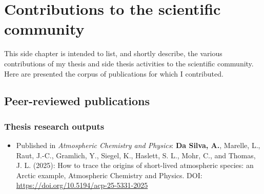 \newpage
\thispagestyle{empty}
\mbox{}
\newpage


\chapter{Contributions to the scientific community}
\label{chap:contrib_commu}

This side chapter is intended to list, and shortly describe, the various contributions of my thesis and side thesis activities to the scientific community.
Here are presented the corpus of publications for which I contributed.

\section*{Peer-reviewed publications}
    \subsection*{Thesis research outputs}
    \begin{itemize}
        \item Published in \textit{Atmospheric Chemistry and Physics}:
            \textbf{Da Silva, A.}, Marelle, L., Raut, J.-C., Gramlich, Y., Siegel, K., Haslett, S. L., Mohr, C., and
Thomas, J. L. (2025): How to trace the origins of short-lived atmospheric species: an Arctic
            example, Atmospheric Chemistry and Physics. DOI: \url{https://doi.org/10.5194/acp-25-5331-2025}

    \end{itemize}
